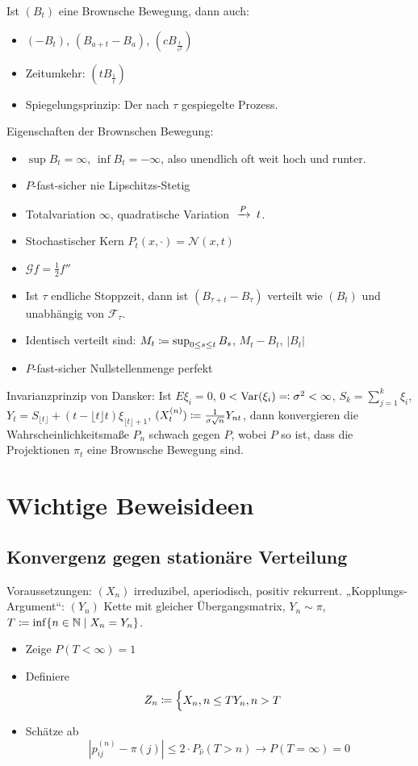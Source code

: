 \documentclass[a4paper,DIV15]{scrartcl}
\newcommand{\cF}{\mathcal F}
\begin{document}
Ist $(B_t)$ eine Brownsche Bewegung, dann auch:
\begin{itemize}
\item $(-B_t)$, $(B_{a+t}-B_a)$, $(cB_{\frac{t}{c^2}})$
\item Zeitumkehr: $(tB_{\frac1t})$
\item Spiegelungsprinzip: Der nach $\tau$ gespiegelte Prozess.
\end{itemize}
Eigenschaften der Brownschen Bewegung:
\begin{itemize}
\item $\sup B_t=\infty$, $\inf B_t=-\infty$, also unendlich oft weit hoch und runter.
\item $P$-fast-sicher nie Lipschitzs-Stetig
\item Totalvariation $\infty$, quadratische Variation $\tonach{$P$}t$.
\item Stochastischer Kern $P_t(x,\cdot) = \mathcal N(x,t)$
\item $\mathcal G f = \frac 12 f''$
\item Ist $\tau$ endliche Stoppzeit, dann ist $(B_{\tau +t} - B_\tau)$ verteilt wie $(B_t)$ und unabhängig von $\cF_\tau$.
\item Identisch verteilt sind: $M_t\da \sup_{0\le s\le t}B_s$, $M_t-B_t$, $|B_t|$
\item $P$-fast-sicher Nullstellenmenge perfekt
\end{itemize}

Invarianzprinzip von Dansker:
Ist $E\xi_i=0$, $0<\operatorname{Var}(\xi_i)\ad \sigma^2<\infty$, $S_k=\sum_{j=1}^k \xi_i$, $Y_t = S_{\lfloor t\rfloor} + (t-\lfloor t\rfloor t)\xi_{\lfloor t\rfloor +1}$, $(X_t^{(n)}) \da \frac1{\sigma\sqrt n} Y_{nt}$, dann konvergieren die Wahrscheinlichkeitsmaße $P_n$ schwach gegen $P$, wobei $P$ so ist, dass die Projektionen $\pi_t$ eine Brownsche Bewegung sind.

\section{Wichtige Beweisideen}

\subsection{Konvergenz gegen stationäre Verteilung}

Voraussetzungen: $(X_n)$ irreduzibel, aperiodisch, positiv rekurrent. „Kopplungs-Argument“: $(Y_n)$ Kette mit gleicher Übergangsmatrix, $Y_n\sim\pi$, $T\da \inf\{n\in\MdN\mid X_n=Y_n\}$.
\begin{itemize}
\item Zeige $P(T<\infty)=1$
\item Definiere 
\[
Z_n \da 
\begin{cases}
X_n,n\le T
Y_n,n> T
\end{cases}
\]
\item Schätze ab
\[
|p_{ij}^{(n)}-\pi(j)| \le 2\cdot P_{\hat \nu}(T>n) \to P(T=\infty) = 0
\]
\end{itemize}
\end{document}
